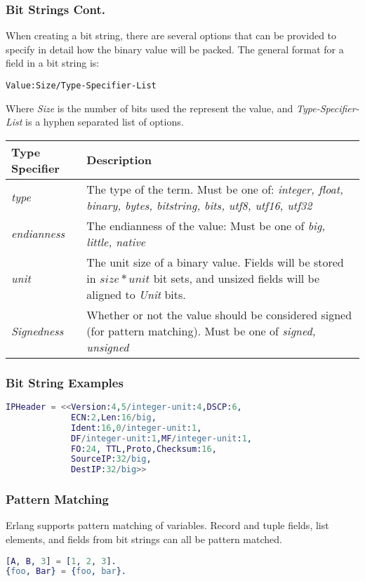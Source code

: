 \documentclass{beamer}
\begin{document}
\begin{frame}[fragile]
  \frametitle{Bit Strings Cont.}
  When creating a bit string, there are several options that can be
  provided to specify in detail how the binary value will be packed.
  The general format for a field in a bit string is:

  \verb!Value:Size/Type-Specifier-List!

  Where \emph{Size} is the number of bits used the represent the
  value, and \emph{Type-Specifier-List} is a hyphen separated list of
  options.
\end{frame}

\begin{frame}[fragile]
  \begin{tabular}{|l|p{3in}|}
    \hline
    Type Specifier & Description \\
    \hline
    \emph{type} & The type of the term.  Must be one of: \emph{integer, float, binary, bytes, bitstring, bits, utf8, utf16, utf32} \\
    \hline
    \emph{endianness} & The endianness of the value: Must be one of \emph{big, little, native} \\
    \hline
    \emph{unit} & The unit size of a binary value.  Fields will be stored in $size * unit$ bit sets, and unsized fields will be aligned to \emph{Unit} bits. \\
    \hline
    \emph{Signedness} & Whether or not the value should be considered signed (for pattern matching).  Must be one of \emph{signed, unsigned}\\
    \hline
  \end{tabular}
\end{frame}

\begin{frame}[fragile]
  \frametitle{Bit String Examples}
\begin{lstlisting}[language=erlang]
IPHeader = <<Version:4,5/integer-unit:4,DSCP:6,
             ECN:2,Len:16/big,
             Ident:16,0/integer-unit:1,
             DF/integer-unit:1,MF/integer-unit:1,
             FO:24, TTL,Proto,Checksum:16,
             SourceIP:32/big,
             DestIP:32/big>>
\end{lstlisting}
\end{frame}

\begin{frame}[fragile]
  \frametitle{Pattern Matching}
  Erlang supports pattern matching of variables.  Record and tuple
  fields, list elements, and fields from bit strings can all be
  pattern matched.
\begin{lstlisting}[language=erlang]
[A, B, 3] = [1, 2, 3].
{foo, Bar} = {foo, bar}.
\end{lstlisting}
\end{frame}
\end{document}
